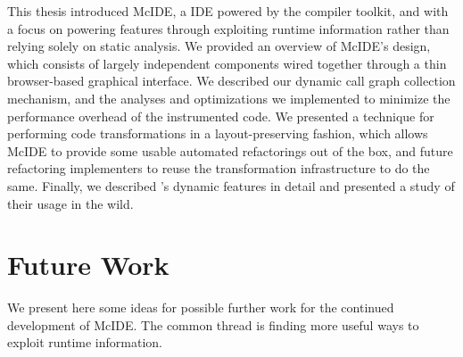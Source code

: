 This thesis introduced McIDE, a \matlab IDE powered by the \mclab compiler
toolkit, and with a focus on powering features through exploiting runtime
information rather than relying solely on static analysis. We provided an
overview of McIDE's design, which consists of largely independent components
wired together through a thin browser-based graphical interface. We described
our dynamic call graph collection mechanism, and the analyses and optimizations
we implemented to minimize the performance overhead of the instrumented code.
We presented a technique for performing code transformations in a
layout-preserving fashion, which allows McIDE to provide some usable automated
refactorings out of the box, and future refactoring implementers to reuse the
transformation infrastructure to do the same. Finally, we described \matlab's
dynamic features in detail and presented a study of their usage in the wild.

\section{Future Work}

We present here some ideas for possible further work for the continued
development of McIDE. The common thread is finding more useful ways to exploit
runtime information.

